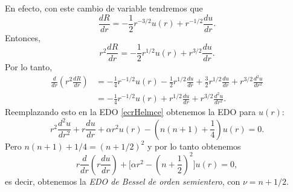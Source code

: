 En efecto, con este cambio de variable tendremos que
\begin{equation}
\frac{dR}{dr} = -\frac{1}{2} r^{-3/2} u(r) + r^{-1/2} \frac{du}{dr}.
\end{equation}
Entonces, 
\begin{equation}
r^2 \frac{dR}{dr} = -\frac{1}{2} r^{1/2} u(r) + r^{3/2} \frac{du}{dr}.
\end{equation}
Por lo tanto,
\begin{align}
\frac{d}{dr}\left(r^2 \frac{dR}{dr}\right) &= -\frac{1}{4} r^{-1/2} u(r) - \frac{1}{2} r^{1/2} \frac{du}{dr} + \frac{3}{2} r^{1/2} \frac{du}{dr} + r^{3/2} \frac{d^2u}{dr^2} \\
&= -\frac{1}{4} r^{-1/2} u(r) + r^{1/2} \frac{du}{dr} + r^{3/2} \frac{d^2u}{dr^2}.
\end{align}
Reemplazando esto en la EDO \eqref{ecrHelmce} obtenemos la EDO para $u(r)$:
\begin{equation}
r^2 \frac{d^2u}{dr^2} + r \frac{du}{dr} + \alpha r^2 u(r) - \left(n(n+1) + \frac{1}{4}\right) u(r) = 0.
\end{equation}
Pero $n(n+1) + 1/4 = (n+1/2)^2$ y por lo tanto obtenemos
\begin{equation}
r \frac{d}{dr}\left(r \frac{du}{dr}\right) + \Big[ \alpha r^2 - \left(n+\frac{1}{2}\right)^2 \Big] u(r) = 0,
\end{equation}
es decir, obtenemos la \textit{EDO de Bessel de orden semientero}, con $\nu = n+1/2$.

